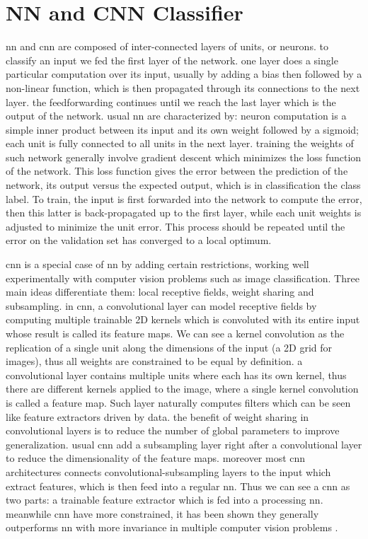 \documentclass[a4paper,12pt]{report}
\begin{document}
\section{NN and CNN Classifier}

nn and cnn are composed of inter-connected layers of units, or neurons.
to classify an input we fed the first layer of the network.
one layer does a single particular computation over its input, usually by adding a bias then followed by a non-linear function, which is then propagated through its connections to the next layer.
the feedforwarding continues until we reach the last layer which is the output of the network.
usual nn are characterized by: neuron computation is a simple inner product between its input and its own weight followed by a sigmoid; each unit is fully connected to all units in the next layer.
training the weights of such network generally involve gradient descent which minimizes the loss function of the network.
This loss function gives the error between the prediction of the network, its output versus the expected output, which is in classification the class label.
To train, the input is first forwarded into the network to compute the error, then this latter is back-propagated up to the first layer, while each unit weights is adjusted to minimize the unit error.
This process should be repeated until the error on the validation set has converged to a local optimum.

cnn is a special case of nn by adding certain restrictions, working well experimentally with computer vision problems such as image classification.
Three main ideas differentiate them: local receptive fields, weight sharing and subsampling.
in cnn, a convolutional layer can model receptive fields by computing multiple trainable 2D kernels which is convoluted with its entire input whose result is called its feature maps.
We can see a kernel convolution as the replication of a single unit along the dimensions of the input (a 2D grid for images), thus all weights are constrained to be equal by definition.
a convolutional layer contains multiple units where each has its own kernel, thus there are different kernels applied to the image, where a single kernel convolution is called a feature map.
Such layer naturally computes filters which can be seen like feature extractors driven by data.
the benefit of weight sharing in convolutional layers is to reduce the number of global parameters to improve generalization.
usual cnn add a subsampling layer right after a convolutional layer to reduce the dimensionality of the feature maps.
moreover most cnn architectures connects convolutional-subsampling layers to the input which extract features, which is then feed into a regular nn.
Thus we can see a cnn as two parts: a trainable feature extractor which is fed into a processing nn.
meanwhile cnn have more constrained, it has been shown they generally outperforms nn with more invariance in multiple computer vision problems \cite{simard2003best}\cite{mnist_web}\cite{lawrence1997face}\cite{krizhevsky2012imagenet}.
\end{document}
